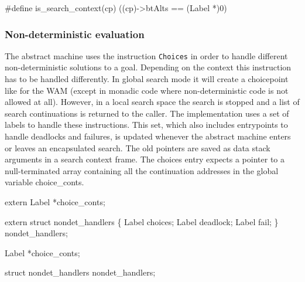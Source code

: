 \nwenddocs{}\plusendmoddef\nwstartdeflinemarkup{}\nwenddeflinemarkup
#define is_search_context(cp)   ((cp)->btAlts == (Label *)0)

\nwendcode{}\nwdocspar
\subsubsection{Non-deterministic evaluation}
The abstract machine uses the instruction \texttt{Choices} in order
to handle different non-deterministic solutions to a goal. Depending
on the context this instruction has to be handled differently. In
global search mode it will create a choicepoint like for the WAM
(except in monadic code where non-deterministic code is not allowed at
all). However, in a local search space the search is stopped and a
list of search continuations is returned to the caller. The
implementation uses a set of labels to handle these instructions. This
set, which also includes entrypoints to handle deadlocks and failures,
is updated whenever the abstract machine enters or leaves an
encapsulated search. The old pointers are saved as data stack
arguments in a search context frame. The {\Tt{}choices\nwendquote} entry expects a
pointer to a null-terminated array containing all the continuation
addresses in the global variable {\Tt{}choice{\_}conts\nwendquote}.

\nwenddocs{}\plusendmoddef\nwstartdeflinemarkup{}\nwenddeflinemarkup
extern Label *choice_conts;

extern struct nondet_handlers \{
    Label choices;
    Label deadlock;
    Label fail;
\} nondet_handlers;

\nwendcode{}\nwdocspar
\nwenddocs{}\plusendmoddef\nwstartdeflinemarkup{}\nwenddeflinemarkup
Label *choice_conts;

struct nondet_handlers nondet_handlers;

\nwendcode{}\nwdocspar
